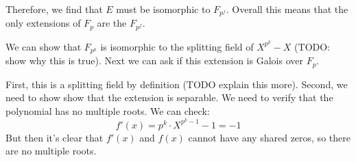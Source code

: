 \documentclass{article}
\begin{document}
Therefore, we find that $ E $ must be isomorphic to $ F_{p^{f}} $. Overall this means that the only extensions of $ F_{p} $ are the $ F_{p^{f}} $.

We can show that $ F_{p^{k}} $ is isomorphic to the splitting field of $ X^{p^{k}} - X $ (TODO: show why this is true). Next we can ask if this extension is Galois over $ F_{p} $.

First, this is a splitting field by definition (TODO explain this more).
Second, we need to show show that the extension is separable. We need to verify that the polynomial has no multiple roots. We can check:
\begin{equation}
f'(x) = p^{k}\cdot X^{p^{k} - 1} - 1 = - 1
\end{equation}
But then it's clear that $f'(x)$ and $f(x)$ cannot have any shared zeros, so there are no multiple roots.
\end{document}
